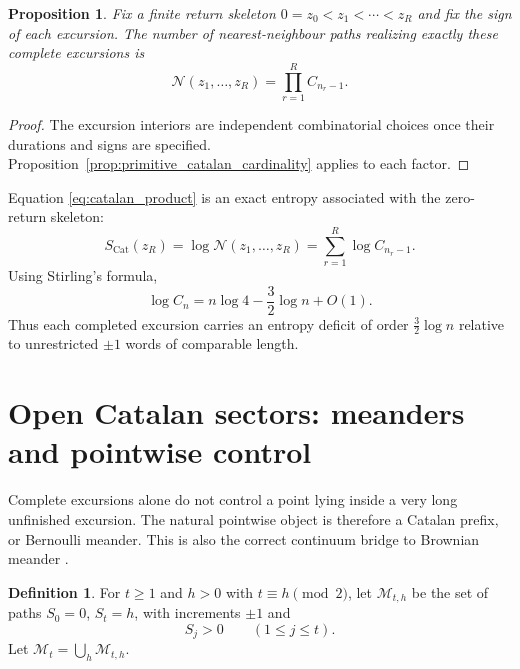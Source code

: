 \documentclass[11pt]{amsart}
\numberwithin{equation}{section}
\theoremstyle{plain}
\newtheorem{proposition}[theorem]{Proposition}
\theoremstyle{definition}
\newtheorem{definition}[theorem]{Definition}
\theoremstyle{remark}
\newcommand{\Cat}{C}
\begin{document}
\begin{proposition}
\label{prop:catalan_product}
Fix a finite return skeleton $0=z_0<z_1<\cdots<z_R$ and fix the sign of each excursion.  The number of nearest-neighbour paths realizing exactly these complete excursions is
\begin{equation}
\mathcal{N}(z_1,\ldots,z_R)
=
\prod_{r=1}^{R}\Cat_{n_r-1}.
\label{eq:catalan_product}
\end{equation}
\end{proposition}

\begin{proof}
The excursion interiors are independent combinatorial choices once their durations and signs are specified.  Proposition~\ref{prop:primitive_catalan_cardinality} applies to each factor.
\end{proof}

Equation \eqref{eq:catalan_product} is an exact entropy associated with the zero-return skeleton:
\begin{equation}
S_{\mathrm{Cat}}(z_R)
=
\log \mathcal{N}(z_1,\ldots,z_R)
=
\sum_{r=1}^{R}\log \Cat_{n_r-1}.
\label{eq:catalan_skeleton_entropy}
\end{equation}
Using Stirling's formula,
\begin{equation}
\log \Cat_n
=
n\log 4-\frac{3}{2}\log n+O(1).
\label{eq:catalan_entropy_asymptotic}
\end{equation}
Thus each completed excursion carries an entropy deficit of order $\frac32\log n$ relative to unrestricted $\pm1$ words of comparable length.

\section{Open Catalan sectors: meanders and pointwise control}
\label{sec:meanders}

Complete excursions alone do not control a point lying inside a very long unfinished excursion.  The natural pointwise object is therefore a Catalan prefix, or Bernoulli meander.  This is also the correct continuum bridge to Brownian meander \cite{DurrettIglehartMiller1977,CsakiMohanty1981}.

\begin{definition}
\label{def:positive_meander}
For $t\ge1$ and $h>0$ with $t\equiv h\pmod 2$, let $\mathcal{M}_{t,h}$ be the set of paths $S_0=0$, $S_t=h$, with increments $\pm1$ and
\begin{equation}
S_j>0\qquad (1\le j\le t).
\label{eq:strict_meander_condition}
\end{equation}
Let $\mathcal{M}_t=\bigcup_h\mathcal{M}_{t,h}$.
\end{definition}
\end{document}
